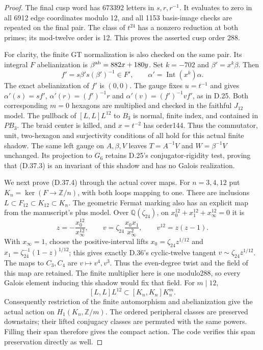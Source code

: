 \begin{proof}
The final cusp word has 673392 letters in $s,r,r^{-1}$.
It evaluates to zero in all 6912 edge coordinates modulo
12, and all 1153 basis-image checks are repeated on the
final pair. The class of $t^{24}$ has a nonzero reduction
at both primes; its mod-twelve order is 12. This proves
the asserted cusp order 288.

For clarity, the finite GT normalization is also checked
on the same pair. Its integral $F$ abelianization is
$\beta^{\rm ab}=882x+180y$. Set $k=-702$ and
$\beta'=x^k\beta$. Then
\[
 f'=s\beta's(\beta')^{-1}\in F',\qquad
 \alpha'=\operatorname{Int}(x^k)\alpha.                 \tag{D.37.16}
\]
The exact abelianization of $f'$ is $(0,0)$. The gauge fixes
$u=t^{-1}$ and gives
$\alpha'(s)=sf'$, $\alpha'(r)=(f')^{-1}r$ and
$\alpha'(v)=(f')^{-1}vf'$, as in D.25. Both corresponding
$m=0$ hexagons are multiplied and checked in the faithful
$J_{12}$ model. The pullback of $[L,L]L^{12}$ to $B_3$
is normal, finite index, and contained in $PB_3$.
The braid center is killed, and $x=t^{-2}$ has order144.
Thus the commutator, unit, two-hexagon and surjectivity
conditions of \cite[Definitions 2.1 and 2.3]{dBDHP2026}
all hold for this actual finite shadow. The same left
gauge on $A,\beta,V$ leaves $T=A^{-1}V$ and
$W=\beta^{-1}V$ unchanged. Its projection to $G_6$ retains
D.25's conjugator-rigidity test, proving that (D.37.3)
is an invariant of this shadow and has no Galois realization.

We next prove (D.37.4) through the actual cover maps.
For $n=3,4,12$ put
$K_n=\ker(F\to\mathbb Z/n)$, with both loops mapping to one.
There are inclusions $L\subset F_{12}\subset K_{12}\subset K_n$.
The geometric Fermat marking also has an explicit map
from the manuscript's plus model. Over $\mathbb Q(\zeta_{24})$,
on $x_0^{12}+x_1^{12}+x_\infty^{12}=0$ it is
\[
 z=-\frac{x_0^{12}}{x_\infty^{12}},\qquad
 v=\zeta_{24}\frac{x_0x_1}{x_\infty^2},
 \qquad v^{12}=z(z-1).
\]
With $x_\infty=1$, choose the positive-interval lifts
$x_0=\zeta_{24}z^{1/12}$ and
$x_1=\zeta_{24}^{-1}(1-z)^{1/12}$; this gives exactly
D.36's cyclic-twelve tangent $v\sim\zeta_{24}z^{1/12}$.
The maps to $C_3,C_4$ are $v\mapsto v^4,v^3$.
Thus the even-degree twist and the field of this map
are retained. The finite multiplier here is one modulo288,
so every Galois element inducing this shadow would fix
that field.
For $m\mid12$,
\[
 [L,L]L^{12}\subset[K_n,K_n]K_n^m.                       \tag{D.37.17}
\]
Consequently restriction of the finite automorphism and
abelianization give the actual action on
$H_1(K_n,\mathbb Z/m)$. The ordered peripheral classes
are preserved downstairs; their lifted conjugacy classes
are permuted with the same powers. Filling their span
therefore gives the compact action. The code verifies
this span preservation directly as well.


\end{proof}

